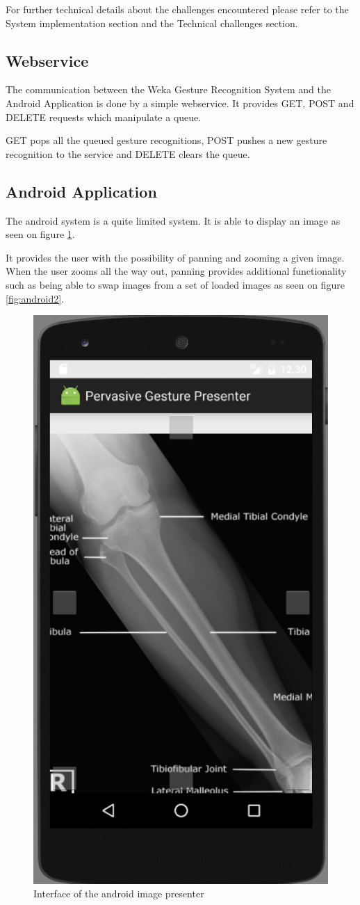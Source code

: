 For further technical details about the challenges encountered please refer to the System implementation section and the Technical challenges section.

\subsection{Webservice}
The communication between the Weka Gesture Recognition System and the Android Application is done by a simple webservice.
It provides GET, POST and DELETE requests which manipulate a queue.

GET pops all the queued gesture recognitions, 
POST pushes a new gesture recognition to the service and DELETE clears the queue.

\subsection{Android Application}
The android system is a quite limited system.
It is able to display an image as seen on figure \ref{fig:android1}.

It provides the user with the possibility of panning and zooming a given image.
When the user zooms all the way out, panning provides additional functionality such as
being able to swap images from a set of loaded images as seen on figure \ref{fig:android2}.

\begin{figure}[!h]
\centering
\includegraphics[width=0.4\columnwidth]{img/android_main}
\caption{Interface of the android image presenter}
\label{fig:android1}
\end{figure}


